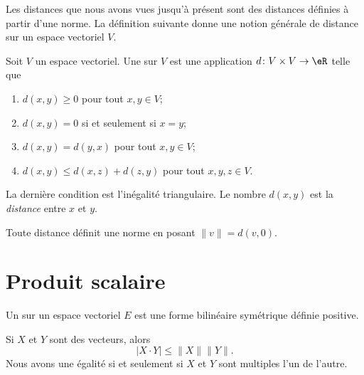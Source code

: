 Les distances que nous avons vues jusqu'à présent sont des distances définies à partir d'une norme. La définition suivante donne une notion générale de distance sur un espace vectoriel \( V\).

\begin{definition}
    Soit \( V\) un espace vectoriel. Une  sur \( V\) est une application \( d\colon V\times V\to \eR\) telle que
    \begin{enumerate}
        \item
            \( d(x,y)\geq 0\) pour tout \( x,y\in V\);
        \item
            \( d(x,y)=0\) si et seulement si \( x=y\);
        \item
            \( d(x,y)=d(y,x)\) pour tout \( x,y\in V\);
        \item
            \( d(x,y)\leq d(x,z)+d(z,y)\) pour tout \( x,y,z\in V\).
    \end{enumerate}
    La dernière condition est l'inégalité triangulaire. Le nombre \( d(x,y)\) est la \emph{distance} entre \( x\) et \( y\).
\end{definition}
Toute distance définit une norme en posant \( \| v \|=d(v,0)\).


\section{Produit scalaire}

\begin{definition}\label{DefVJIeTFj}
    Un  sur un espace vectoriel \( E\) est une forme bilinéaire symétrique définie positive.
\end{definition}

\begin{theorem}      \label{ThoAYfEHG}
	Si $X$ et $Y$ sont des vecteurs, alors
	\begin{equation}
		| X\cdot Y |\leq\| X \|\| Y \|.
	\end{equation}
    Nous avons une égalité si et seulement si \( X\) et \( Y\) sont multiples l'un de l'autre.
\end{theorem}

